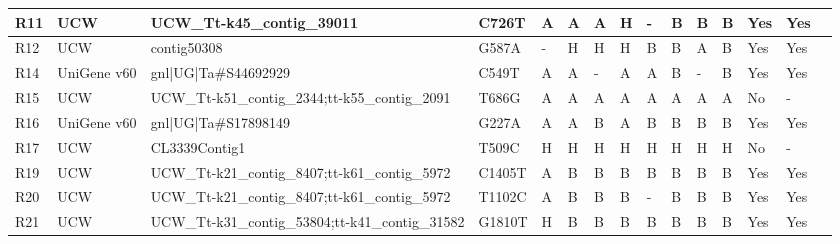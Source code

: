 \begin{sidewaystable}
\begin{localsize}{6}{9}
\begin{tabular}{llllllll|lllllll}
 R11        & UCW         & UCW\_Tt-k45\_contig\_39011                                         & C726T  & A      & A         & A        & H        & -            & B         & B         & B     & Yes           & Yes                    &                         \\
  \midrule
  R12        & UCW         & contig50308                                                     & G587A  & -      & H         & H        & H        & B            & B         & A         & B     & Yes           & Yes                    &                         \\
 R14        & UniGene v60 & gnl|UG|Ta\#S44692929                                             & C549T  & A      & A         & -        & A        & A            & B         & -         & B     & Yes           & Yes                    &                         \\
 R15        & UCW         & UCW\_Tt-k51\_contig\_2344;tt-k55\_contig\_2091                       & T686G  & A      & A         & A        & A        & A            & A         & A         & A     & No            & -                      &                         \\
 R16        & UniGene v60 & gnl|UG|Ta\#S17898149                                             & G227A  & A      & A         & B        & A        & B            & B         & B         & B     & Yes           & Yes                    &                         \\
 R17        & UCW         & CL3339Contig1                                                   & T509C  & H      & H         & H        & H        & H            & H         & H         & H     & No            & -                      &                         \\
 R19        & UCW         & UCW\_Tt-k21\_contig\_8407;tt-k61\_contig\_5972                       & C1405T & A      & B         & B        & B        & B            & B         & B         & B     & Yes           & Yes                    &                         \\
 R20        & UCW         & UCW\_Tt-k21\_contig\_8407;tt-k61\_contig\_5972                       & T1102C & A      & B         & B        & B        & -            & B         & B         & B     & Yes           & Yes                    &                         \\
 R21        & UCW         & UCW\_Tt-k31\_contig\_53804;tt-k41\_contig\_31582                     & G1810T & H      & B         & B        & B        & B            & B         & B         & B     & Yes           & Yes                    &                         \\

\end{tabular}
\end{localsize}
\end{sidewaystable}
